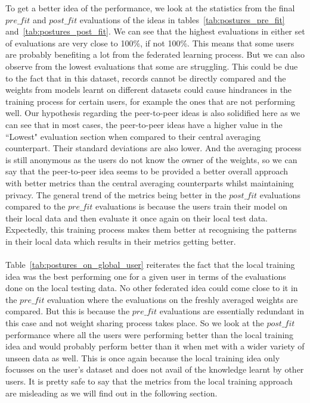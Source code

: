 \documentclass[12pt]{article}
\begin{document}
\noindent To get a better idea of the performance, we look at the statistics from the final $pre\_fit$ and $post\_fit$ evaluations of the ideas in tables~\ref{tab:postures_pre_fit} and~\ref{tab:postures_post_fit}. We can see that the highest evaluations in either set of evaluations are very close to 100\%, if not 100\%. This means that some users are probably benefiting a lot from the federated learning process. But we can also observe from the lowest evaluations that some are struggling. This could be due to the fact that in this dataset, records cannot be directly compared and the weights from models learnt on different datasets could cause hindrances in the training process for certain users, for example the ones that are not performing well. Our hypothesis regarding the peer-to-peer ideas is also solidified here as we can see that in most cases, the peer-to-peer ideas have a higher value in the ``Lowest" evaluation section when compared to their central averaging counterpart. Their standard deviations are also lower. And the averaging process is still anonymous as the users do not know the owner of the weights, so we can say that the peer-to-peer idea seems to be provided a better overall approach with better metrics than the central averaging counterparts whilst maintaining privacy. The general trend of the metrics being better in the $post\_fit$ evaluations compared to the $pre\_fit$ evaluations is because the users train their model on their local data and then evaluate it once again on their local test data. Expectedly, this training process makes them better at recognising the patterns in their local data which results in their metrics getting better. 
\\\\
Table~\ref{tab:postures_on_global_user} reiterates the fact that the local training idea was the best performing one for a given user in terms of the evaluations done on the local testing data. No other federated idea could come close to it in the $pre\_fit$ evaluation where the evaluations on the freshly averaged weights are compared. But this is because the $pre\_fit$ evaluations are essentially redundant in this case and not weight sharing process takes place. So we look at the $post\_fit$ performance where all the users were performing better than the local training idea and would probably perform better than it when met with a wider variety of unseen data as well. This is once again because the local training idea only focusses on the user's dataset and does not avail of the knowledge learnt by other users. It is pretty safe to say that the metrics from the local training approach are misleading as we will find out in the following section.
\end{document}
